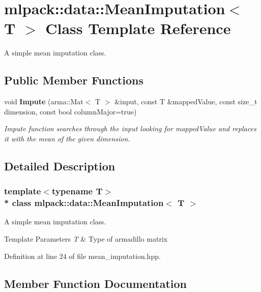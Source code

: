 \section{mlpack\+:\+:data\+:\+:Mean\+Imputation$<$ T $>$ Class Template Reference}
\label{classmlpack_1_1data_1_1MeanImputation}


A simple mean imputation class.  


\subsection*{Public Member Functions}
\begin{DoxyCompactItemize}
\item 
void {\bf Impute} (arma\+::\+Mat$<$ T $>$ \&input, const T \&mapped\+Value, const size\+\_\+t dimension, const bool column\+Major=true)
\begin{DoxyCompactList}\small\item\em Impute function searches through the input looking for mapped\+Value and replaces it with the mean of the given dimension. \end{DoxyCompactList}\end{DoxyCompactItemize}


\subsection{Detailed Description}
\subsubsection*{template$<$typename T$>$\\*
class mlpack\+::data\+::\+Mean\+Imputation$<$ T $>$}

A simple mean imputation class. 


\begin{DoxyTemplParams}{Template Parameters}
{\em T} & Type of armadillo matrix \\
\hline
\end{DoxyTemplParams}


Definition at line 24 of file mean\+\_\+imputation.\+hpp.



\subsection{Member Function Documentation}
